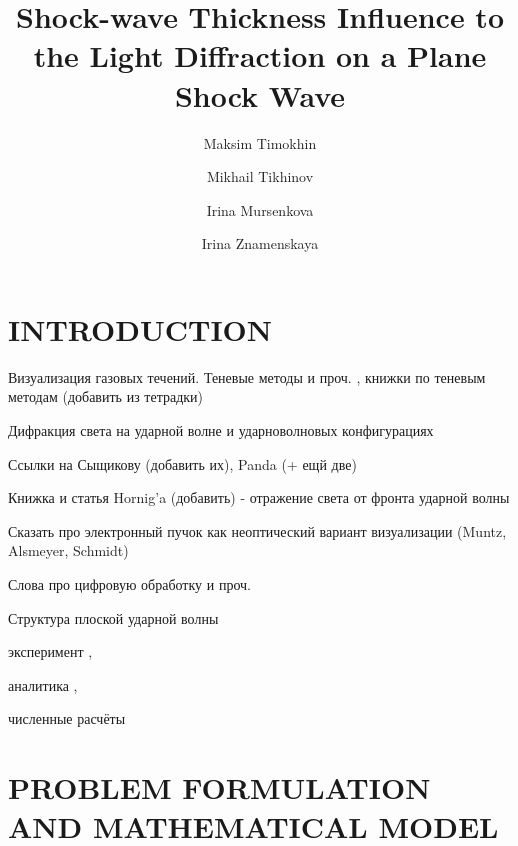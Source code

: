 \documentclass{aip-cp}
\begin{document}
\title{Shock-wave Thickness Influence to the Light Diffraction on a Plane Shock Wave}

\author[aff1,aff2]{Maksim Timokhin}
\author[aff1]{Mikhail Tikhinov}
\author[aff1]{Irina Mursenkova}
\author[aff1]{Irina Znamenskaya}


\maketitle


\begin{abstract}

\end{abstract}

\section{INTRODUCTION}

Визуализация газовых течений. Теневые методы и проч. , книжки по теневым методам (добавить из тетрадки)

Дифракция света на ударной волне и ударноволновых конфигурациях

Ссылки на Сыщикову (добавить их), Panda \cite{Panda_1995} (+ ещй две)

Книжка и статья Hornig'a (добавить) - отражение света от фронта ударной волны

Сказать про электронный пучок как неоптический вариант визуализации (Muntz, Alsmeyer, Schmidt) 

Слова про цифровую обработку и проч. 

Структура плоской ударной волны 

эксперимент \cite{Schmidt_1969, Alsmeyer_1976, Pham-Van-Diep624}, 

аналитика \cite{Becker_1922, Mott-Smith_1951, Salwen_1964}, 

численные расчёты \cite{Kogan, Dodulad_Tcheremissine_2013, Rykov2008, ShockWaves_2015, Struchtrup_Torrilhon_2004, overshoot_2015} 

\section{PROBLEM FORMULATION AND MATHEMATICAL MODEL}
\end{document}
